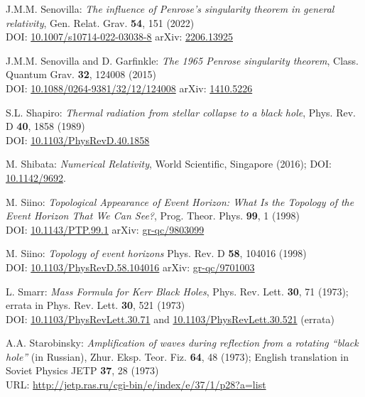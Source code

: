 \begin{thebibliography}{123}
J.M.M. Senovilla:
{\em The influence of Penrose’s singularity theorem in general relativity},
Gen. Relat. Grav.  {\bf 54}, 151 (2022)\\
DOI: \href{https://doi.org/10.1007/s10714-022-03038-8}{10.1007/s10714-022-03038-8}\hfill
arXiv: \href{https://arxiv.org/abs/2206.13925}{2206.13925}

J.M.M. Senovilla and D. Garfinkle:
{\em The 1965 Penrose singularity theorem},
Class. Quantum Grav. {\bf 32}, 124008 (2015)\\
DOI: \href{https://doi.org/10.1088/0264-9381/32/12/124008}{10.1088/0264-9381/32/12/124008}\hfill
arXiv: \href{https://arxiv.org/abs/1410.5226}{1410.5226}

S.L. Shapiro:
{\em Thermal radiation from stellar collapse to a black hole},
Phys. Rev. D {\bf 40}, 1858 (1989)\\
DOI: \href{https://doi.org/10.1103/PhysRevD.40.1858}{10.1103/PhysRevD.40.1858}

M. Shibata:
{\em Numerical Relativity},
World Scientific, Singapore (2016);
DOI: \href{https://doi.org/10.1142/9692}{10.1142/9692}.

M. Siino: {\em Topological Appearance of Event Horizon:
What Is the Topology of the Event Horizon That We Can See?},
Prog. Theor. Phys. {\bf 99}, 1 (1998)\\
DOI: \href{https://doi.org/10.1143/PTP.99.1}{10.1143/PTP.99.1}\hfill
arXiv: \href{https://arxiv.org/abs/gr-qc/9803099}{gr-qc/9803099}

M. Siino: {\em Topology of event horizons}
Phys. Rev. D {\bf 58}, 104016 (1998)\\
DOI: \href{https://doi.org/10.1103/PhysRevD.58.104016}{10.1103/PhysRevD.58.104016}\hfill
arXiv: \href{https://arxiv.org/abs/gr-qc/9701003}{gr-qc/9701003}

L. Smarr: {\em Mass Formula for Kerr Black Holes},
Phys. Rev. Lett. {\bf 30}, 71 (1973); errata in Phys. Rev. Lett. {\bf 30}, 521 (1973)\\
DOI: \href{https://doi.org/10.1103/PhysRevLett.30.71}{10.1103/PhysRevLett.30.71}
and
\href{https://doi.org/10.1103/PhysRevLett.30.521}{10.1103/PhysRevLett.30.521} (errata)

A.A. Starobinsky:
{\em Amplification of waves during reflection from a rotating ``black hole''} (in Russian),
Zhur. Eksp. Teor. Fiz. {\bf 64}, 48 (1973); English translation in
Soviet Physics JETP {\bf 37}, 28 (1973)\\
URL: \url{http://jetp.ras.ru/cgi-bin/e/index/e/37/1/p28?a=list}


\end{thebibliography}
